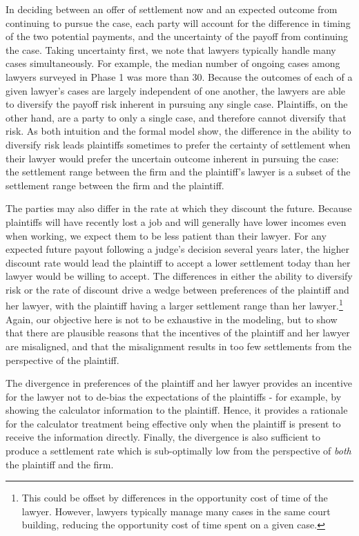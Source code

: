 \documentclass[11pt, a4paper]{article}
\begin{document}
In deciding between an offer of settlement now and an expected outcome from continuing to pursue the case, each party will account for the difference in timing of the two potential payments, and the uncertainty of the payoff from continuing the case. Taking uncertainty first, we note that lawyers typically handle many cases simultaneously. For example, the median number of ongoing cases among lawyers surveyed in Phase 1 was more than 30. Because the outcomes of each of a given lawyer's cases are largely independent of one another, the lawyers are able to diversify the payoff risk inherent in pursuing any single case. Plaintiffs, on the other hand, are a party to only a single case, and therefore cannot diversify that risk. As both intuition and the formal model show, the difference in the ability to diversify risk leads plaintiffs sometimes to prefer the certainty of settlement when their lawyer would prefer the uncertain outcome inherent in pursuing the case: the settlement range between the firm and the plaintiff's lawyer is a subset of the settlement range between the firm and the plaintiff.

The parties may also differ in the rate at which they discount the future. Because plaintiffs will have recently lost a job and will generally have lower incomes even when working, we expect them to be less patient than their lawyer. For any expected future payout following a judge's decision several years later, the higher discount rate would lead the plaintiff to accept a lower settlement today than her lawyer would be willing to accept. The differences in either the ability to diversify risk or the rate of discount drive a wedge between preferences of the plaintiff and her lawyer, with the plaintiff having a larger settlement range than her lawyer.\footnote{This could be offset by differences in the opportunity cost of time of the lawyer. However, lawyers typically manage many cases in the same court building, reducing the opportunity cost of time spent on a given case.} Again, our objective here is not to be exhaustive in the modeling, but to show that there are plausible reasons that the incentives of the plaintiff and her lawyer are misaligned, and that the misalignment results in too few settlements from the perspective of the plaintiff. 

The divergence in preferences of the plaintiff and her lawyer provides an incentive for the lawyer not to de-bias the expectations of the plaintiffs - for example, by showing the calculator information to the plaintiff. Hence, it provides a rationale for the calculator treatment being effective only when the plaintiff is present to receive the information directly. Finally, the divergence is also sufficient to produce a settlement rate which is sub-optimally low from the perspective of \textit{both} the plaintiff and the firm. 
\end{document}
